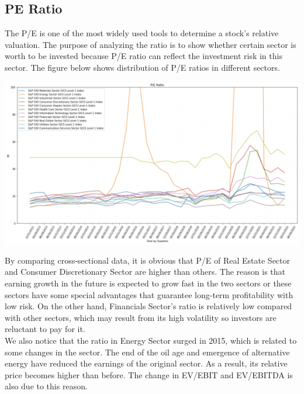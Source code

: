 \documentclass{article}
\begin{document}
\subsection{PE Ratio}
The P/E is one of the most widely used tools to determine a stock’s relative valuation. The purpose of analyzing the ratio is to show whether certain sector is worth to be invested because P/E ratio can reflect the investment risk in this sector. The figure below shows distribution of P/E ratios in different sectors.
\begin{center}
    \includegraphics[scale=0.4]{PE_Ratio.png}
\end{center}
By comparing cross-sectional data, it is obvious that P/E of Real Estate Sector and Consumer Discretionary Sector are higher than others. The reason is that earning growth in the future is expected to grow fast in the two sectors or these sectors have some special advantages that guarantee long-term profitability with low risk. On the other hand, Financials Sector’s ratio is relatively low compared with other sectors, which may result from its high volatility so investors are reluctant to pay for it.\\
We also notice that the ratio in Energy Sector surged in 2015, which is related to some changes in the sector. The end of the oil age and emergence of alternative energy have reduced the earnings of the original sector. As a result, its relative price becomes higher than before. The change in EV/EBIT and EV/EBITDA is also due to this reason.
\end{document}
